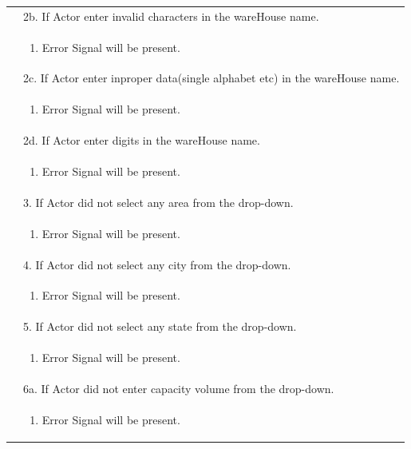 \documentclass[12pt,a4paper]{report}
\begin{document}
\begin{tabular}{ | m{3cm} | m{12cm}| } \hline
& 2b. If Actor enter invalid characters in the wareHouse name. \\
& \begin{enumerate}
		\item Error Signal will be present.
	\end{enumerate}
\\ 
& 2c. If Actor enter inproper data(single alphabet etc) in the wareHouse name. \\
& \begin{enumerate}
		\item Error Signal will be present.
	\end{enumerate}
\\ 
& 2d. If Actor enter digits in the wareHouse name. \\
& \begin{enumerate}
		\item Error Signal will be present.
	\end{enumerate}
\\ 

& 3. If Actor did not select any area from the drop-down. \\
& \begin{enumerate}
		\item Error Signal will be present.
	\end{enumerate}
\\ 

&  4. If Actor did not select any city from the drop-down. \\
& \begin{enumerate}
		\item Error Signal will be present.
	\end{enumerate}
\\ 
&  5. If Actor did not select any state from the drop-down. \\
& \begin{enumerate}
		\item Error Signal will be present.
	\end{enumerate}
\\
&  6a. If Actor did not enter capacity volume  from the drop-down. \\
& \begin{enumerate}
		\item Error Signal will be present.
	\end{enumerate}
\\


\end{tabular}
\end{document}
